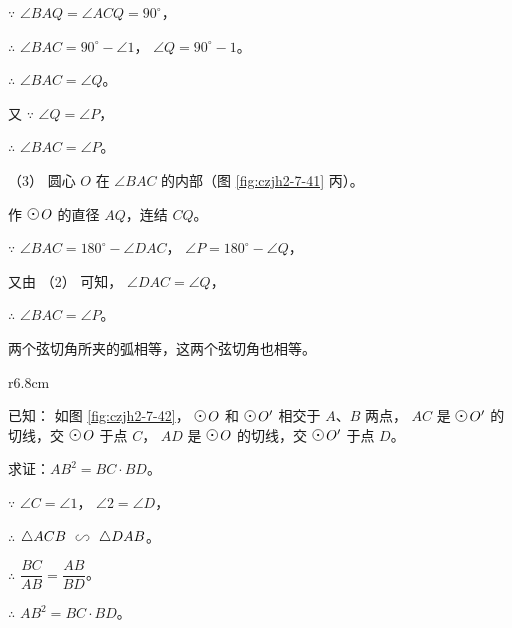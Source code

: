 $\because$ \quad $\angle BAQ = \angle ACQ = 90^\circ$，

$\therefore$ \quad $\angle BAC = 90^\circ - \angle 1$， $\angle Q = 90^\circ - 1$。

$\therefore$ \quad $\angle BAC = \angle Q$。

又 $\because$ \quad $\angle Q = \angle P$，

$\therefore$ \quad $\angle BAC = \angle P$。

（3） 圆心 $O$ 在 $\angle BAC$ 的内部（图 \ref{fig:czjh2-7-41} 丙）。

作 $\yuan\,O$ 的直径 $AQ$，连结 $CQ$。

$\because$ \quad $\angle BAC = 180^\circ - \angle DAC$， $\angle P = 180^\circ - \angle Q$，

又由 （2） 可知， $\angle DAC = \angle Q$，

$\therefore$ \quad $\angle BAC = \angle P$。

\begin{tuilun}[推论]
    两个弦切角所夹的弧相等，这两个弦切角也相等。
\end{tuilun}

\begin{wrapfigure}[5]{r}{6.8cm}
    \centering
    
    \caption{}\label{fig:czjh2-7-42}
\end{wrapfigure}

\liti 已知： 如图 \ref{fig:czjh2-7-42}， $\yuan\,O$ 和 $\yuan\,O'$ 相交于 $A$、$B$ 两点，
$AC$ 是 $\yuan\,O'$ 的切线，交 $\yuan\,O$ 于点 $C$，
$AD$ 是 $\yuan\,O$  的切线，交 $\yuan\,O'$ 于点 $D$。

求证：$AB^2 = BC \cdot BD$。

\begin{enhancedline}
\zhengming $\because$ \quad $\angle C = \angle 1$， $\angle 2 = \angle D$，

$\therefore$ \quad $\triangle ACB \xiangsi \triangle DAB$。

$\therefore$ \quad $\dfrac{BC}{AB} = \dfrac{AB}{BD}$。

$\therefore$ \quad $AB^2 = BC \cdot BD$。
\end{enhancedline}

